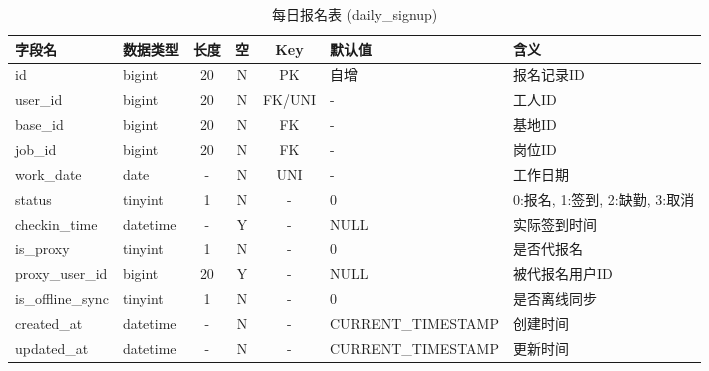\documentclass[UTF8,a4paper,12pt]{article}
\begin{document}
\begin{table}[H]
    \centering
    \caption{每日报名表 (daily\_signup)}
    \label{tab:daily_signup}
    \small
    \renewcommand{\arraystretch}{1.3}
    \begin{tabular}{|l|l|c|c|c|l|l|}
        \hline
        \rowcolor{gray!15} \textbf{字段名} & \textbf{数据类型} & \textbf{长度} & \textbf{空} & \textbf{Key} & \textbf{默认值} & \textbf{含义} \\ \hline
        id & bigint & 20 & N & PK & 自增 & 报名记录ID \\ \hline
        user\_id & bigint & 20 & N & FK/UNI & - & 工人ID \\ \hline
        base\_id & bigint & 20 & N & FK & - & 基地ID \\ \hline
        job\_id & bigint & 20 & N & FK & - & 岗位ID \\ \hline
        work\_date & date & - & N & UNI & - & 工作日期 \\ \hline
        status & tinyint & 1 & N & - & 0 & 0:报名, 1:签到, 2:缺勤, 3:取消 \\ \hline
        checkin\_time & datetime & - & Y & - & NULL & 实际签到时间 \\ \hline
        is\_proxy & tinyint & 1 & N & - & 0 & 是否代报名 \\ \hline
        proxy\_user\_id & bigint & 20 & Y & - & NULL & 被代报名用户ID \\ \hline
        is\_offline\_sync & tinyint & 1 & N & - & 0 & 是否离线同步 \\ \hline
        created\_at & datetime & - & N & - & CURRENT\_TIMESTAMP & 创建时间 \\ \hline
        updated\_at & datetime & - & N & - & CURRENT\_TIMESTAMP & 更新时间 \\ \hline
    \end{tabular}
\end{table}
\end{document}
